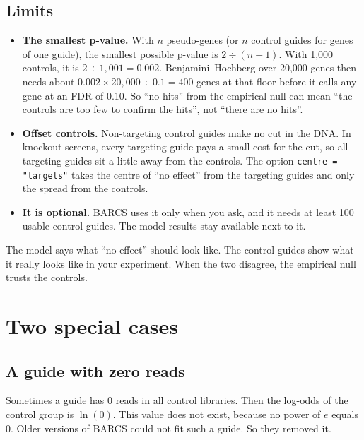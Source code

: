 \subsection{Limits}

\begin{itemize}
\item \textbf{The smallest p-value.} With $n$ pseudo-genes (or $n$ control
  guides for genes of one guide), the smallest possible p-value is
  $2 \div (n+1)$. With 1{,}000 controls, it is $2 \div 1{,}001 = 0.002$.
  Benjamini--Hochberg over 20{,}000 genes then needs about
  $0.002 \times 20{,}000 \div 0.1 = 400$ genes at that floor before it
  calls any gene at an FDR of 0.10. So ``no hits'' from the empirical null
  can mean ``the controls are too few to confirm the hits'', not ``there
  are no hits''.
\item \textbf{Offset controls.} Non-targeting control guides make no cut
  in the DNA. In knockout screens, every targeting guide pays a small cost
  for the cut, so all targeting guides sit a little away from the controls.
  The option \texttt{centre = "targets"} takes the centre of ``no effect''
  from the targeting guides and only the spread from the controls.
\item \textbf{It is optional.} BARCS uses it only when you ask, and it needs
  at least 100 usable control guides. The model results stay available next
  to it.
\end{itemize}

\begin{remember}
The model says what ``no effect'' should look like. The control guides show
what it really looks like in your experiment. When the two disagree,
the empirical null trusts the controls.
\end{remember}

\section{Two special cases}

\subsection{A guide with zero reads}

Sometimes a guide has 0 reads in all control libraries. Then the log-odds
of the control group is $\ln(0)$. This value does not exist, because no
power of $e$ equals 0. Older versions of BARCS could not fit such a guide.
So they removed it.

